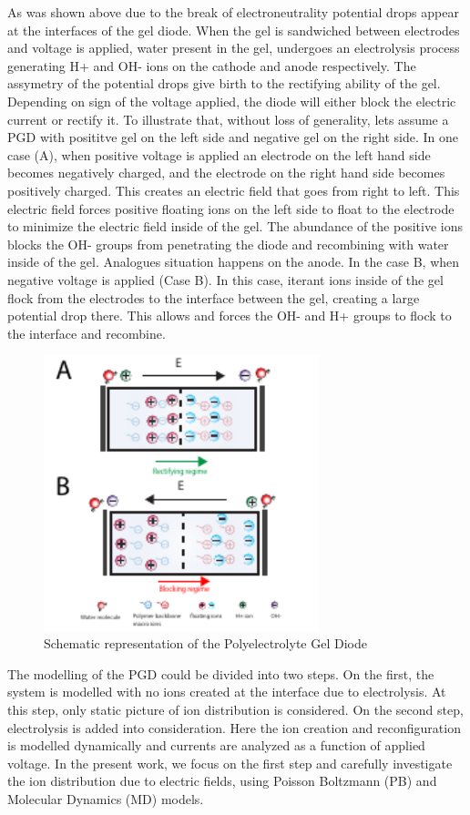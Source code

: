 \documentclass[twoside,twocolumn,9pt]{article}
\begin{document}
As was shown above due to the break of electroneutrality potential drops appear at the interfaces of the gel diode. When the gel is sandwiched between electrodes and voltage is applied, water present in the gel, undergoes an electrolysis process generating H+ and OH- ions on the cathode and anode respectively. The assymetry of the potential drops give birth to the rectifying ability of the gel. Depending on sign of the voltage applied, the diode will either block the electric current or rectify it. To illustrate that, without loss of generality, lets assume a PGD with posititve gel on the left side and negative gel on the right side. In one case (A), when positive voltage is applied an electrode on the left hand side becomes negatively charged, and the electrode on the right hand side becomes positively charged. This creates an electric field that goes from right to left. This electric field forces positive floating ions on the left side to float to the electrode to minimize the electric field inside of the gel. The abundance of the positive ions blocks the OH- groups from penetrating the diode and recombining with water inside of the gel. Analogues situation happens on the anode. In the case B, when negative voltage is applied (Case B). In this case, iterant ions inside of the gel flock from the electrodes  to the interface between the gel, creating a large potential drop there. This allows and forces the OH- and H+ groups to flock to the interface and recombine.


\begin{figure}[h]
\centering
  \includegraphics[height=8cm]{fig/diode.pdf}
  \caption{Schematic representation of the Polyelectrolyte Gel Diode}
  \label{fig:e0_lb10}
\end{figure}

The modelling of the PGD could be divided into two steps. On the first, the system is modelled with no ions created at the interface due to electrolysis. At this step, only static picture of ion distribution is considered. On the second step, electrolysis is added into consideration. Here the ion creation and reconfiguration is modelled dynamically and currents are analyzed as a function of applied voltage. In the present work, we focus on the first step and carefully investigate the ion distribution due to electric fields, using Poisson Boltzmann (PB) and Molecular Dynamics (MD) models. 
\end{document}
